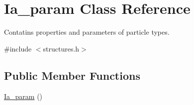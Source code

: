 \hypertarget{class_ia__param}{\section{Ia\+\_\+param Class Reference}
\label{class_ia__param}
}


Contatins properties and parameters of particle types.  




{\ttfamily \#include $<$structures.\+h$>$}

\subsection*{Public Member Functions}
\begin{DoxyCompactItemize}
\item 
\hyperlink{class_ia__param_a6f2f8ef5653298711b1a32455169ed86}{Ia\+\_\+param} ()
\end{DoxyCompactItemize}
